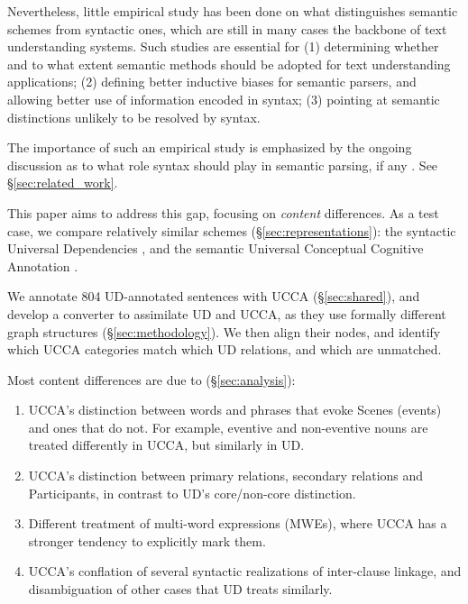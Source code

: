 \documentclass[11pt,a4paper,table]{article}
\begin{document}
  Nevertheless, little empirical study has been done on what distinguishes semantic schemes from
  syntactic ones, which are still in many cases the backbone of text understanding systems. 
  Such studies are essential for 
  (1) determining whether and to what extent semantic methods should be adopted for text understanding applications;
  (2) defining better inductive biases for semantic parsers, and allowing better use of information encoded in syntax;
  (3) pointing at semantic distinctions unlikely to be resolved by syntax.

  The importance of such an empirical study is emphasized by the ongoing discussion as to what role syntax should
  play in semantic parsing, if any \cite{swayamdipta2018syntactic,strubell2018linguistically,P18-1192,C18-1233}.
  See \S\ref{sec:related_work}.

  This paper aims to address this gap,
  focusing on {\it content} differences.
  As a test case, we compare relatively similar schemes (\S\ref{sec:representations}):
  the syntactic Universal Dependencies \cite[UD; ][]{nivre2016universal},
  and the semantic Universal Conceptual Cognitive Annotation \cite[UCCA; ][]{abend2013universal}.
  
  We annotate 804 UD-annotated sentences with UCCA (\S\ref{sec:shared}),
  and develop a converter to assimilate UD and UCCA,
  as they use formally different graph structures
  (\S\ref{sec:methodology}).
  We then align their nodes, and identify which UCCA categories match which UD relations,
  and which are unmatched.

  Most content differences are due to (\S\ref{sec:analysis}):
  \begin{enumerate}[itemsep=0.159mm,leftmargin=5.95mm]
      \item UCCA's distinction between words and phrases that evoke Scenes (events) and ones that do not.
        For example, eventive and non-eventive nouns are treated differently in UCCA, but similarly in UD.
      \item UCCA's distinction between primary relations, secondary relations
        and Participants, in contrast to UD's core/non-core distinction. %
      \item Different treatment of multi-word expressions (MWEs),
        where UCCA has a stronger tendency to explicitly mark them. %
      \item UCCA's conflation of several syntactic realizations of inter-clause linkage,
        and disambiguation of other cases that UD treats similarly.
   \end{enumerate}
\end{document}
